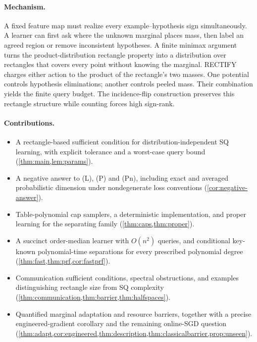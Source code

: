 \paragraph{Mechanism.}
A fixed feature map must realize every example--hypothesis sign simultaneously. A learner can first ask where the unknown marginal places mass, then label an agreed region or remove inconsistent hypotheses. A finite minimax argument turns the product-distribution rectangle property into a distribution over rectangles that covers every point without knowing the marginal. RECTIFY charges either action to the product of the rectangle's two masses. One potential controls hypothesis eliminations; another controls peeled mass. Their combination yields the finite query budget. The incidence-flip construction preserves this rectangle structure while counting forces high sign-rank.

\paragraph{Contributions.}
\begin{itemize}[leftmargin=*,itemsep=2pt]
\item A rectangle-based sufficient condition for distribution-independent SQ learning, with explicit tolerance and a worst-case query bound (\cref{thm:main,lem:params}).
\item A negative answer to (L), (P) and (Pn), including exact and averaged probabilistic dimension under nondegenerate loss conventions (\cref{cor:negative-answer}).
\item Table-polynomial cap samplers, a deterministic implementation, and proper learning for the separating family (\cref{thm:caps,thm:proper}).
\item A succinct order-median learner with $O(n^2)$ queries, and conditional key-known polynomial-time separations for every prescribed polynomial degree (\cref{thm:fast,thm:prf,cor:fastprf}).
\item Communication sufficient conditions, spectral obstructions, and examples distinguishing rectangle size from SQ complexity (\cref{thm:communication,thm:barrier,thm:halfspaces}).
\item Quantified marginal adaptation and resource barriers, together with a precise engineered-gradient corollary and the remaining online-SGD question (\cref{thm:adapt,cor:engineered,thm:description,thm:classicalbarrier,prop:unseen}).
\end{itemize}

